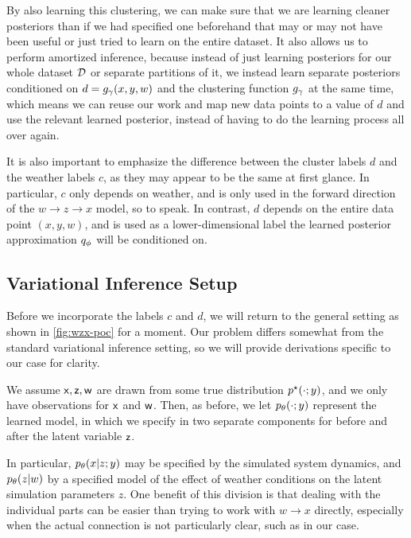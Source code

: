 By also learning this clustering, we can make sure that we are learning cleaner posteriors than if we had specified one beforehand that may or may not have been useful or just tried to learn on the entire dataset. It also allows us to perform amortized inference, because instead of just learning posteriors for our whole dataset $\mathcal D$ or separate partitions of it, we instead learn separate posteriors conditioned on $d=\gvd{x,y,w}$ and the clustering function $g_{\gamma}$ at the same time, which means we can reuse our work and map new data points to a value of $d$ and use the relevant learned posterior, instead of having to do the learning process all over again.

It is also important to emphasize the difference between the cluster labels $d$ and the weather labels $c$, as they may appear to be the same at first glance. In particular, $c$ only depends on weather, and is only used in the forward direction of the $w\to z\to x$ model, so to speak. In contrast, $d$ depends on the entire data point $(x,y,w)$, and is used as a lower-dimensional label the learned posterior approximation $q_{\phi}$ will be conditioned on.


\subsection{Variational Inference Setup}

Before we incorporate the labels $c$ and $d$, we will return to the general setting as shown in \cref{fig:wzx-poc} for a moment. Our problem differs somewhat from the standard variational inference setting, so we will provide derivations specific to our case for clarity. 

We assume $\mathsf x,\mathsf z,\mathsf w$ are drawn from some true distribution $\ptd{\cdot;y}$, and we only have observations for $\mathsf x$ and $\mathsf w$. Then, as before, we let $\pld{\cdot;y}$ represent the learned model, in which we specify in two separate components for before and after the latent variable $\mathsf z$.

In particular, $\pld{x\given z;y}$ may be specified by the simulated system dynamics, and $\pld{z\given w}$ by a specified model of the effect of weather conditions on the latent simulation parameters $z$. One benefit of this division is that dealing with the individual parts can be easier than trying to work with $w\to x$ directly, especially when the actual connection is not particularly clear, such as in our case.

